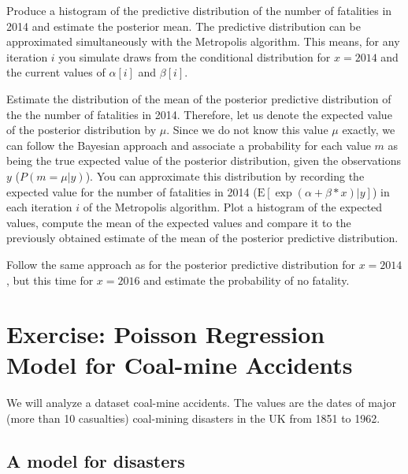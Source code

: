
 
Produce a histogram of the predictive distribution of the number of fatalities in 2014 and estimate the posterior mean. 
The predictive distribution can be approximated simultaneously with the Metropolis algorithm. 
This means, for any iteration $i$ you simulate draws from the conditional distribution for $x = 2014$ and the current values of $\alpha[i]$ and $\beta[i]$.
 
Estimate the distribution of the mean of the posterior predictive distribution of the the number of fatalities in 2014. 
Therefore, let us denote the expected value of the posterior distribution by $\mu$. 
Since we do not know this value $\mu$ exactly, we can follow the Bayesian approach and associate a probability for each value $m$ as being the true expected value of the posterior distribution, given the observations $y$ ($P(m = \mu|y)$).
You can approximate this distribution by recording the expected value for the number of fatalities in 2014 ($\text{E}[\exp(\alpha+\beta*x)|y]$) in each iteration $i$ of the Metropolis algorithm. 
Plot a histogram of the expected values, compute the mean of the expected values and compare it to the previously obtained estimate of the mean of the posterior predictive distribution.
 
Follow the same approach as for the posterior predictive distribution for $x = 2014$, but this time for $x = 2016$ and estimate the probability of no fatality.
 
 
 
 

\newpage
\FloatBarrier
\section{Exercise: Poisson Regression Model for Coal-mine Accidents}
 
We will analyze a dataset coal-mine accidents.
The values are the dates of major (more than 10 casualties) coal-mining disasters in the UK from 1851 to 1962. 


\subsection{A model for disasters}


